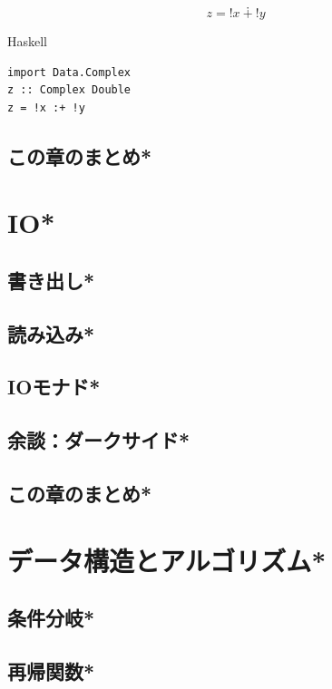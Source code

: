 \documentclass[a4paper,twocolumn]{jsbook}
\newcommand{\programminglanguage}[1]{\textsf{#1}}
\newcommand{\haskell}{\programminglanguage{Haskell}}
\newenvironment{haskellcode}{\begin{itembox}[r]{\haskell}}{\end{itembox}}
\begin{document}

\begin{equation}
z={}!x{}\dotplus{}!y
\end{equation}

\begin{haskellcode}
\begin{verbatim}
import Data.Complex
z :: Complex Double
z = !x :+ !y
\end{verbatim}
\end{haskellcode}




\section{この章のまとめ*}

\chapter{IO*}
\section{書き出し*}
\section{読み込み*}
\section{IOモナド*}
\section{余談：ダークサイド*}
\section{この章のまとめ*}

\chapter{データ構造とアルゴリズム*}
\section{条件分岐*}
\section{再帰関数*}
\end{document}
